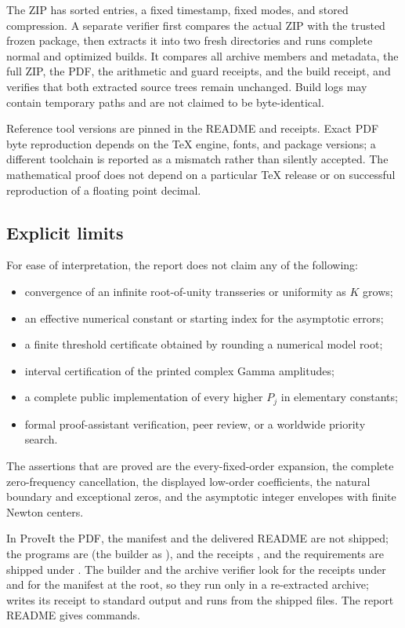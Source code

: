 The ZIP has sorted entries, a fixed timestamp, fixed modes, and stored compression. A separate verifier first compares the actual ZIP with the trusted frozen package, then extracts it into two fresh directories and runs complete normal and optimized builds. It compares all archive members and metadata, the full ZIP, the PDF, the arithmetic and guard receipts, and the build receipt, and verifies that both extracted source trees remain unchanged. Build logs may contain temporary paths and are not claimed to be byte-identical.

Reference tool versions are pinned in the README and receipts. Exact PDF byte reproduction depends on the TeX engine, fonts, and package versions; a different toolchain is reported as a mismatch rather than silently accepted. The mathematical proof does not depend on a particular TeX release or on successful reproduction of a floating point decimal.

\subsection{Explicit limits}
For ease of interpretation, the report does not claim any of the following:
\begin{itemize}
\item convergence of an infinite root-of-unity transseries or uniformity as $K$ grows;
\item an effective numerical constant or starting index for the asymptotic errors;
\item a finite threshold certificate obtained by rounding a numerical model root;
\item interval certification of the printed complex Gamma amplitudes;
\item a complete public implementation of every higher $P_j$ in elementary constants;
\item formal proof-assistant verification, peer review, or a worldwide priority search.
\end{itemize}
The assertions that are proved are the every-fixed-order expansion, the complete zero-frequency cancellation, the displayed low-order coefficients, the natural boundary and exceptional zeros, and the asymptotic integer envelopes with finite Newton centers.
\begin{writenote}
In ProveIt the PDF, the manifest and the delivered README are not shipped; the
programs are  (the builder as ), and the
receipts ,  and the
requirements are shipped under . The builder and the archive
verifier look for the receipts under  and for the manifest at the
root, so they run only in a re-extracted archive;  writes its
receipt to standard output and runs from the shipped files. The report README
gives commands.
\end{writenote}
